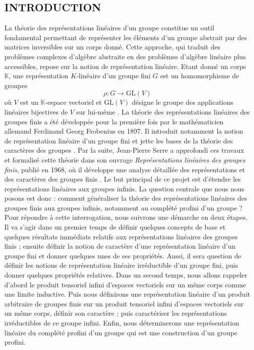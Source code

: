 \documentclass[a4paper, 14pt]{report}
\newcommand{\applyfontsize}{%
	\fontsize{12}{12}\selectfont
}
\begin{document}
\begin{onehalfspace}
		\chapter*{INTRODUCTION}
		{
			\applyfontsize %
			La théorie des représentations linéaires d’un groupe constitue un outil fondamental permettant de représenter les éléments d’un groupe abstrait par des matrices inversibles sur un corps donné. Cette approche, qui traduit des problèmes complexes d’algèbre abstraite en des problèmes d’algèbre linéaire plus accessibles, repose sur la notion de représentation linéaire. Etant donné un corps $\mathbb{K}$, une représentation $K$-linéaire d’un groupe fini $G$ est un homomorphisme de groupes \[ \rho : G \to \text{GL}(V) \]
			où $V$ est un $\mathbb{K}$-espace vectoriel et $\text{GL}(V)$ désigne le groupe des applications linéaires bijectives de $V$ sur lui-même \cite{serre1971representation}. 
			La théorie des représentations linéaires des groupes finis a été développée pour la première fois par le mathématicien allemand Ferdinand Georg Frobenius en 1897. Il introduit notamment la notion de représentation linéaire d’un groupe fini et jette les bases de la théorie des caractères des groupes \cite{minkowski1911gesammelte}. Par la suite, Jean-Pierre Serre a approfondi ces travaux et formalisé cette théorie dans son ouvrage \emph{Représentations linéaires des groupes finis}, publié en 1968, où il développe une analyse détaillée des représentations et des caractères des groupes finis \cite{serre1971representation}.
			Le but principal de ce projet est d’étendre les représentations linéaires aux groupes infinis.
			La question centrale que nous nous posons est donc :  
			comment généraliser la théorie des représentations linéaires des groupes finis aux groupes infinis, notamment au complété profini d'un groupe ?
			Pour répondre à cette interrogation, nous suivrons une démarche en deux étapes.
			Il va s’agir dans un premier temps de définir quelques concepts de base et quelques résultats immédiats relatifs aux représentations linéaires des groupes finis ; ensuite définir la notion de caractère d’une représentation linéaire d’un groupe fini et donner quelques unes de ses propriétés. Aussi, il sera question de définir les notions de représentation linéaire irréductible d’un groupe fini, puis donner quelques propriétés relatives.
			Dans un second temps, nous allons rappeler d’abord le produit tensoriel infini d’espaces vectoriels
			sur un même corps comme une limite inductive. Puis nous définirons une représentation linéaire d’un produit arbitraire de groupes finis sur un produit tensoriel infini d’espaces vectoriels sur un même corps, définir son caractère ; puis caractériser les représentations irréductibles de ce groupe infini. Enfin, nous déterminerons une représentation linéaire du complété profini d’un groupe qui est une construction d’un groupe profini.
			
}
\end{onehalfspace}
\end{document}
